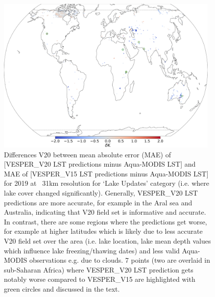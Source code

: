 \documentclass[hess, twostagejnl]{copernicus}
\begin{document}
\begin{figure}[t]
	\includegraphics[width=0.98\textwidth]{lake_haver.png}
	\caption{Differences V20 between mean absolute error (MAE) of [VESPER\_V20 LST predictions minus Aqua-MODIS LST] and MAE of [VESPER\_V15 LST predictions minus Aqua-MODIS LST] for 2019 at ~31km resolution for ‘Lake Updates’ category (i.e. where lake cover changed significantly). Generally, VESPER\_V20 LST predictions are more accurate, for example in the Aral sea and Australia, indicating that V20 field set is informative and accurate. In contrast, there are some regions where the predictions get worse, for example at higher latitudes which is likely due to less accurate V20 field set over the area (i.e. lake location, lake mean depth values which influence lake freezing/thawing dates) and less valid Aqua-MODIS observations e.g. due to clouds. 7 points (two are overlaid in sub-Saharan Africa) where VESPER\_V20 LST prediction gets notably worse compared to VESPER\_V15 are highlighted with green circles and discussed in the text.}
	\label{fig:bitstring_100110}
\end{figure}
\end{document}
